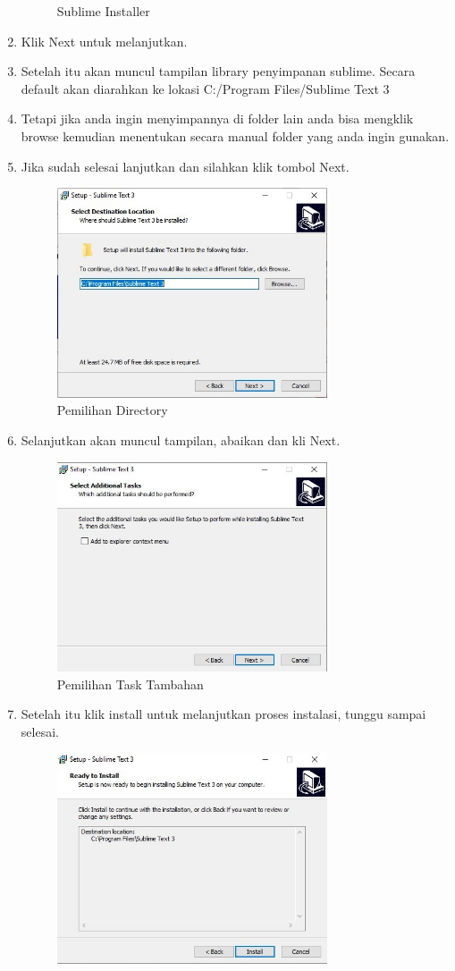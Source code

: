 \begin{enumerate}
\begin{figure}[H]
		\centering
		\caption{Sublime Installer}
	\end{figure}
\item Klik Next untuk melanjutkan.
\item Setelah itu akan muncul tampilan library penyimpanan sublime. Secara default akan diarahkan ke lokasi C:/Program Files/Sublime Text 3
\item Tetapi jika anda ingin menyimpannya di folder lain anda bisa mengklik browse kemudian menentukan secara manual folder yang anda ingin gunakan.
\item Jika sudah selesai lanjutkan dan silahkan klik tombol Next.
	\begin{figure}[H]
		\includegraphics[width=8cm]{figures/instalasi/sb4.jpg}
		\centering
		\caption{Pemilihan Directory}
	\end{figure}
\item Selanjutkan akan muncul tampilan, abaikan dan kli Next.
	\begin{figure}[H]
		\includegraphics[width=8cm]{figures/instalasi/sb5.jpg}
		\centering
		\caption{Pemilihan Task Tambahan}
	\end{figure}
\item Setelah itu klik install untuk melanjutkan proses instalasi, tunggu sampai selesai.
	\begin{figure}[H]
		\includegraphics[width=8cm]{figures/instalasi/sb6.jpg}

\end{figure}
\end{enumerate}
